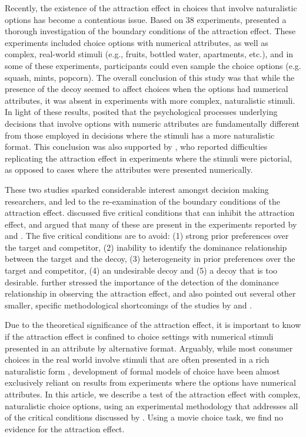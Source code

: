 \documentclass[12pt, a4paper]{article}
\begin{document}
Recently, the existence of the attraction effect in choices that involve naturalistic options has become a contentious issue. Based on 38 experiments,  presented a thorough investigation of the boundary conditions of the attraction effect. These experiments included choice options with numerical attributes, as well as complex, real-world stimuli (e.g., fruits, bottled water, apartments, etc.), and in some of these experiments, participants could even sample the choice options (e.g. squash, mints, popcorn). The overall conclusion of this study was that while the presence of the decoy seemed to affect choices when the options had numerical attributes, it was absent in experiments with more complex, naturalistic stimuli. In light of these results, \citeauthor{Frederick2014} posited that the psychological processes underlying decisions that involve options with numeric attributes are fundamentally different from those employed in decisions where the stimuli has a more naturalistic format. This conclusion was also supported by , who reported difficulties replicating the attraction effect in experiments where the stimuli were pictorial, as opposed to cases where the attributes were presented numerically.

These two studies sparked considerable interest amongst decision making researchers, and led to the re-examination of the boundary conditions of the attraction effect.  discussed five critical conditions that can inhibit the attraction effect, and argued that many of these are present in the experiments reported by  and . The five critical conditions are to avoid: (1) strong prior preferences over the target and competitor, (2) inability to identify the dominance relationship  between the target and the decoy, (3) heterogeneity in prior preferences over the target and competitor, (4) an undesirable decoy and (5) a decoy that is too desirable.  further stressed the importance of the detection of the dominance relationship in observing the attraction effect, and also pointed out several other smaller, specific methodological shortcomings of the studies by \citeauthor{Frederick2014} and \citeauthor{Yang2014}.

Due to the theoretical significance of the attraction effect, it is important to know if the attraction effect is confined to choice settings with numerical stimuli presented in an attribute by alternative format. Arguably, while most consumer choices in the real world involve stimuli that are often presented in a rich naturalistic form \cite{Bhatia2018b}, development of formal models of choice have been almost exclusively reliant on results from experiments where the options have numerical attributes. In this article, we describe a test of the attraction effect with complex, naturalistic choice options, using an experimental methodology that addresses all of the critical conditions discussed by . Using a movie choice task, we find no evidence for the attraction effect.
\end{document}
